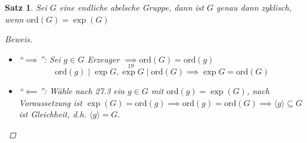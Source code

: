 \documentclass[a4paper]{report}
\theoremstyle{plain}
\newtheorem{satz}[thm]{Satz}
\theoremstyle{definition}
\begin{document}
\begin{satz}
Sei $G$ eine endliche abelsche Gruppe, dann ist $G$ genau dann zyklisch, wenn $\mathrm{ord}(G) = \exp(G)$
\begin{proof}[Beweis] \item
\begin{itemize}
\item ``$\implies$'': Sei $g \in G$ Erzeuger $\underset{19}\implies \mathrm{ord}(G) = \mathrm{ord}(g)$
$$\mathrm{ord}(g) \mid \exp G, \exp G \mid \mathrm{ord}(G) \implies \exp G = \mathrm{ord}(G)$$
\item ``$\impliedby$'': Wähle nach 27.3 ein $g \in G$ mit $\mathrm{ord}(g) = \exp(G)$, nach Voraussetzung ist $\exp(G) = \mathrm{ord}(g) \implies \mathrm{ord}(g) = \mathrm{ord}(G) \implies \langle g \rangle \subseteq G$ ist Gleichheit, d.h. $\langle g \rangle = G.$
\end{itemize}
\end{proof}
\end{satz}
\end{document}
